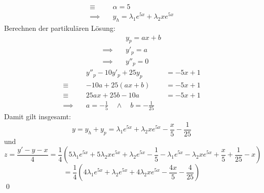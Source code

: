 \documentclass[answers]{exam}
\begin{document}
\begin{questions}
\begin{parts}
\begin{solution}
$$\begin{aligned}
                    \equiv \quad   & \alpha = 5                                   \\
                    \implies \quad & y_h = \lambda_1 e^{5x} + \lambda_2 xe^{5x}
                \end{aligned}
            $$
            Berechnen der partikulären Lösung:
            $$
                \begin{aligned}
                                   & y_p = ax + b \\
                    \implies \quad & y'_p = a     \\
                    \implies \quad & y''_p  = 0
                \end{aligned}
            $$
            $$
                \begin{aligned}
                                   & y''_p -10y'_p + 25y_p                                &  & = - 5x+ 1 \\
                    \equiv \quad   & -10a + 25(ax + b)                                    &  & = - 5x+ 1 \\
                    \equiv \quad   & 25ax + 25b-10a                                       &  & = - 5x+ 1 \\
                    \implies \quad & a = -\frac{1}{5} \quad \land \quad b = -\frac{1}{25}
                \end{aligned}
            $$
            Damit gilt insgesamt:
            $$
                y = y_h + y_p = \lambda_1 e^{5x} + \lambda_2 xe^{5x} - \frac{x}{5} - \frac{1}{25}
            $$
            und
            $$
                z = \frac{y' - y - x}{4} = \frac{1}{4}\left( 5\lambda_1e^{5x} + 5\lambda_2xe^{5x} + \lambda_2e^{5x} - \frac{1}{5} - \lambda_1 e^{5x} - \lambda_2 xe^{5x} + \frac{x}{5} + \frac{1}{25} - x \right)
            $$
            $$
                = \frac{1}{4}\left(4\lambda_1e^{5x} + \lambda_2e^{5x} + 4\lambda_2xe^{5x} - \frac{4x}{5} - \frac{4}{25}\right)
            $$\qed
        \end{solution}


\end{parts}
\end{questions}
\end{document}
